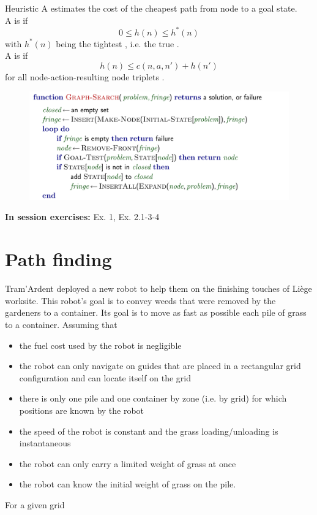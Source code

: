 \documentclass[11pt, a4paper]{article}
\begin{document}
\begin{thbox}{Heuristic}
    A  estimates the cost of the cheapest path from node  to a goal state.\\
    A  is  if
    $$0 \leq h(n) \leq h^*(n)$$
    with $h^*(n)$ being the tightest , i.e. the true .\\
    A  is  if
    $$h(n) \leq c(n,a,n') + h(n')$$
    for all node-action-resulting node triplets .
\end{thbox}

\begin{figure}[h]
    \centering
    \includegraphics[width=.9\linewidth]{figures/graph-search.png}
\end{figure}


\textbf{In session exercises:} Ex. 1, Ex. 2.1-3-4 

\newpage

\section{Path finding}

Tram'Ardent deployed a new robot to help them on the finishing touches of Liège worksite. This robot's goal is to convey weeds that were removed by the gardeners to a container. Its goal is to move as fast as possible each pile of grass to a container. Assuming that 
\begin{itemize}
    \item the fuel cost used by the robot is negligible
    \item the robot can only navigate on guides that are placed in a rectangular grid configuration and can locate itself on the grid
    \item there is only one pile and one container by zone (i.e. by grid) for which positions are known by the robot
    \item the speed of the robot is constant and the grass loading/unloading is instantaneous
    \item the robot can only carry a limited weight of grass at once
    \item the robot can know the initial weight of grass on the pile.
\end{itemize}
For a given grid
\end{document}

